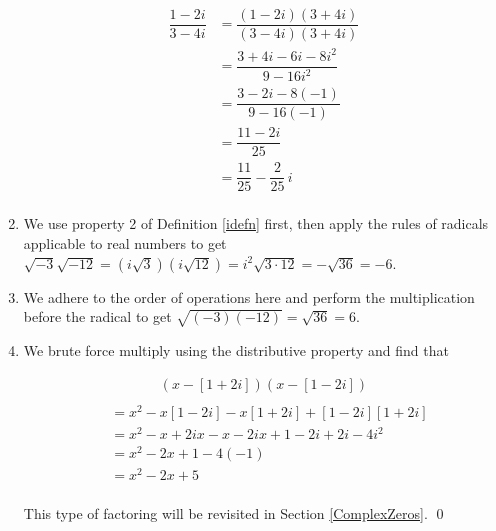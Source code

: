 \begin{ex}
\begin{enumerate}
\begin{align*}
 \dfrac{1-2i}{3-4i} & = \dfrac{(1-2i)(3+4i)}{(3-4i)(3+4i)} \tag{Equivalent Fractions} \\
& = \dfrac{3 + 4i - 6i - 8i^2}{9 - 16i^2} \tag{F.O.I.L.}\\
& = \dfrac{3 - 2i - 8(-1)}{9  - 16(-1)} \tag{$i^2 = -1$}\\
& = \dfrac{11 - 2i}{25} \\
& = \dfrac{11}{25} - \dfrac{2}{25} \, i \\ 
\end{align*}
										
\item  We use property 2 of Definition \ref{idefn} first, then apply the rules of radicals applicable to real numbers to get $\sqrt{-3} \sqrt{-12} = \left(i \sqrt{3}\right) \left(i \sqrt{12}\right) = i^2 \sqrt{3\cdot 12} = -\sqrt{36} = -6$.

\item  We adhere to the order of operations here and perform the multiplication before the radical to get  $\sqrt{(-3)(-12)} = \sqrt{36} = 6$. 

\item  We brute force multiply using the distributive property and find that

\begin{multline*}
(x-[1+2i])(x-[1-2i])\\
\end{multline*}
\begin{align*}
& =  x^2 -x[1-2i]-x[1+2i]+[1-2i][1+2i] \tag{F.O.I.L.}\\
&= x^2-x+2ix-x-2ix+1-2i+2i-4i^2 \tag{Distribute} \\
&= x^2-2x + 1-4(-1) \tag{Gather like terms; $i^2=-1$}\\
&= x^2 -2x +5 \\
\end{align*}

This type of factoring will be revisited in Section \ref{ComplexZeros}. \qed

\end{enumerate}

\end{ex}


